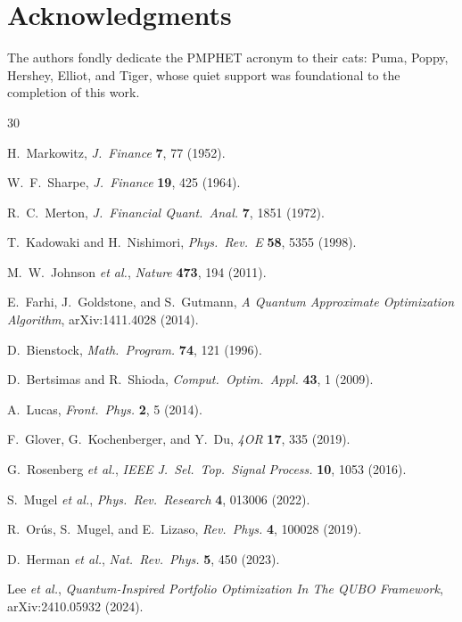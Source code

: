 \documentclass[aps, reprint, prl, twocolumn, superscriptaddress,amsmath,amssymb,noeprint]{revtex4-2}
\begin{document}
\section*{Acknowledgments}
The authors fondly dedicate the PMPHET acronym to their cats: Puma, Poppy, Hershey, Elliot, and Tiger, whose quiet support was foundational to the completion of this work.

\begin{thebibliography}{30}

H.~Markowitz, \emph{J.\ Finance} \textbf{7}, 77 (1952).

W.~F.~Sharpe, \emph{J.\ Finance} \textbf{19}, 425 (1964).

R.~C.~Merton, \emph{J.\ Financial Quant.\ Anal.} \textbf{7}, 1851 (1972).

T.~Kadowaki and H.~Nishimori, \emph{Phys.\ Rev.\ E} \textbf{58}, 5355 (1998).

M.~W.~Johnson \emph{et al.}, \emph{Nature} \textbf{473}, 194 (2011).

E.~Farhi, J.~Goldstone, and S.~Gutmann, \emph{A Quantum Approximate
Optimization Algorithm}, arXiv:1411.4028 (2014).

D.~Bienstock, \emph{Math.\ Program.} \textbf{74}, 121 (1996).

D.~Bertsimas and R.~Shioda, \emph{Comput.\ Optim.\ Appl.} \textbf{43}, 1 (2009).

A.~Lucas, \emph{Front.\ Phys.} \textbf{2}, 5 (2014).

F.~Glover, G.~Kochenberger, and Y.~Du, \emph{4OR} \textbf{17}, 335 (2019).


G.~Rosenberg \emph{et al.}, \emph{IEEE J.\ Sel.\ Top.\ Signal Process.}
\textbf{10}, 1053 (2016).

S.~Mugel \emph{et al.}, \emph{Phys.\ Rev.\ Research} \textbf{4}, 013006 (2022).

R.~Or\'{u}s, S.~Mugel, and E.~Lizaso, \emph{Rev.\ Phys.} \textbf{4}, 100028
(2019).

D.~Herman \emph{et al.}, \emph{Nat.\ Rev.\ Phys.} \textbf{5}, 450 (2023).

Lee \textit{et al.}, \emph{Quantum-Inspired Portfolio Optimization In The QUBO
Framework}, arXiv:2410.05932 (2024).


\end{thebibliography}
\end{document}
